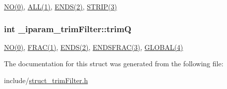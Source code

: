 \hyperlink{defines_8h_a996bde01ecac342918f0a2c4e7ce7bd5}{N\+O(0)}, \hyperlink{defines_8h_a1edd1ea8bddaf4d9c5eb3eae1ee1726a}{A\+L\+L(1)}, \hyperlink{defines_8h_a052e72209cfac2ff9aa78294f0bebea8}{E\+N\+D\+S(2)}, \hyperlink{defines_8h_a53529d9638a1d70f6e5989dedf4c2672}{S\+T\+R\+I\+P(3)} \hypertarget{struct__iparam__trimFilter_a5b5344041c9313230de07c9485227203}{
\subsubsection[{trim\+Q}]{\setlength{\rightskip}{0pt plus 5cm}int \+\_\+iparam\+\_\+trim\+Filter\+::trim\+Q}}\label{struct__iparam__trimFilter_a5b5344041c9313230de07c9485227203}
\hyperlink{defines_8h_a996bde01ecac342918f0a2c4e7ce7bd5}{N\+O(0)}, \hyperlink{defines_8h_a653af6bd29f56a2699de26a928820da7}{F\+R\+A\+C(1)}, \hyperlink{defines_8h_a052e72209cfac2ff9aa78294f0bebea8}{E\+N\+D\+S(2)}, \hyperlink{defines_8h_abf0b71573c7ffc4f6746c24c9abc202a}{E\+N\+D\+S\+F\+R\+A\+C(3)}, \hyperlink{defines_8h_a3de33738fd3c7e77bffbcfaefc3e7645}{G\+L\+O\+B\+A\+L(4)} 

The documentation for this struct was generated from the following file\+:\begin{DoxyCompactItemize}
\item 
include/\hyperlink{struct__trimFilter_8h}{struct\+\_\+trim\+Filter.\+h}\end{DoxyCompactItemize}
